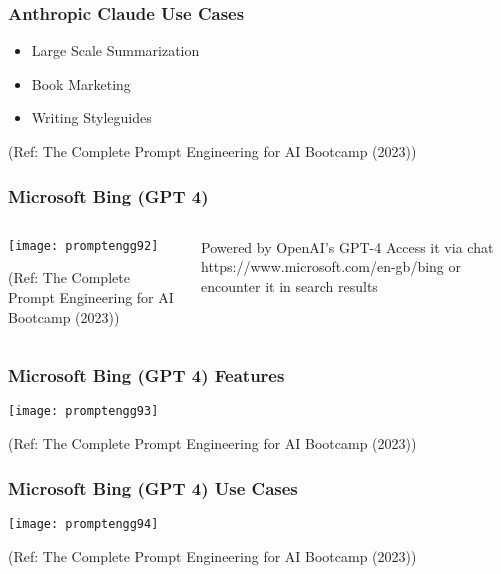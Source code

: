 \begin{frame}[fragile]\frametitle{Anthropic Claude Use Cases}

\begin{itemize}
\item Large Scale Summarization
\item Book Marketing
\item Writing Styleguides
\end{itemize}	 

{\tiny (Ref: The Complete Prompt Engineering for AI Bootcamp (2023))}

\end{frame}


\begin{frame}[fragile]\frametitle{Microsoft Bing (GPT 4)}


\begin{columns}
    \begin{column}[T]{0.6\linewidth}
		\begin{center}
		\texttt{[image: promptengg92]}

		{\tiny (Ref: The Complete Prompt Engineering for AI Bootcamp (2023))}
		\end{center}	
    \end{column}
    \begin{column}[T]{0.4\linewidth}
		Powered by OpenAI’s GPT-4
		Access it via chat https://www.microsoft.com/en-gb/bing or encounter it in search results
    \end{column}
  \end{columns}
\end{frame}


\begin{frame}[fragile]\frametitle{Microsoft Bing (GPT 4) Features}


		\begin{center}
		\texttt{[image: promptengg93]}

		{\tiny (Ref: The Complete Prompt Engineering for AI Bootcamp (2023))}
		\end{center}	

\end{frame}

\begin{frame}[fragile]\frametitle{Microsoft Bing (GPT 4) Use Cases}


		\begin{center}
		\texttt{[image: promptengg94]}

		{\tiny (Ref: The Complete Prompt Engineering for AI Bootcamp (2023))}
		\end{center}	

\end{frame}



